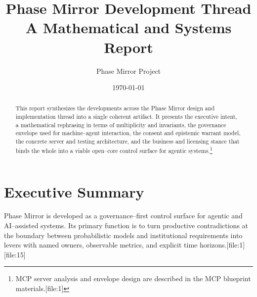 \documentclass[11pt]{article}
\title{Phase Mirror Development Thread\\
A Mathematical and Systems Report}
\author{Phase Mirror Project}
\date{\today}
\begin{document}
\maketitle

\begin{abstract}
This report synthesizes the developments across the Phase Mirror design and implementation thread into a single coherent artifact. It presents the executive intent, a mathematical rephrasing in terms of multiplicity and invariants, the governance envelope used for machine--agent interaction, the consent and epistemic warrant model, the concrete server and testing architecture, and the business and licensing stance that binds the whole into a viable open--core control surface for agentic systems.\footnote{MCP server analysis and envelope design are described in the MCP blueprint materials.[file:1]} 
\end{abstract}

\tableofcontents

\newpage

\section{Executive Summary}

Phase Mirror is developed as a governance--first control surface for agentic and AI--assisted systems. Its primary function is to turn productive contradictions at the boundary between probabilistic models and institutional requirements into levers with named owners, observable metrics, and explicit time horizons.[file:1][file:15]
\end{document}
